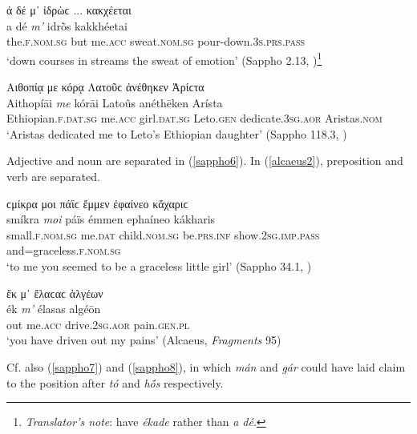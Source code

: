 \begin{exe}
\ex ἀ δέ μ᾽ ἰδρὼϲ ... κακχέεται\\
\gll a dé \emph{m'} idrṑs kakkhéetai\\
the.\textsc{f.nom.sg} but me.\textsc{acc} sweat.\textsc{nom.sg} pour-down.\textsc{3s.prs.pass}\\
\trans `down courses in streams the sweat of emotion' (Sappho 2.13, \citealp[31.13]{LobelPage1968})\footnote{\emph{Translator's note}: \citet[31.13]{LobelPage1968} have \textit{ékade} rather than \textit{a dé}.}
\label{sappho4}
\end{exe}

\begin{exe}
\ex Αιθοπίᾳ {με} κόρᾳ Λατοῦϲ ἀνέθηκεν Ἀρίϲτα\\
\gll Aithopíāi \emph{me} kórāi Latoûs anéthēken Arísta\\
Ethiopian.\textsc{f.dat.sg} me.\textsc{acc} girl.\textsc{dat.sg} Leto.\textsc{gen} dedicate.\textsc{3sg.aor} Aristas.\textsc{nom}\\
\trans `Aristas dedicated me to Leto's Ethiopian daughter' (Sappho 118.3, \citealp[Epigrammata 6.269]{LobelPage1968})
\label{sappho5}
\end{exe}

Adjective and noun are separated in (\ref{sappho6}). In (\ref{alcaeus2}), preposition and verb are separated.

\begin{exe}
\ex ϲμίκρα {μοι} πάϊϲ ἔμμεν ἐφαίνεο κἄχαριϲ\\
\gll smíkra \emph{moi} páïs émmen ephaíneo kákharis\\
small.\textsc{f.nom.sg} me.\textsc{dat} child.\textsc{nom.sg} be.\textsc{prs.inf} show.\textsc{2sg.imp.pass} and=graceless.\textsc{f.nom.sg}\\
\trans `to me you seemed to be a graceless little girl' (Sappho 34.1, \citealp[59.2]{LobelPage1968})
\label{sappho6}
\end{exe}

\begin{exe}
\ex ἔκ μ᾽ ἔλαϲαϲ ἀλγέων\\
\gll ék \emph{m'} élasas algéōn\\
out me.\textsc{acc} drive.\textsc{2sg.aor} pain.\textsc{gen.pl}\\
\trans `you have driven out my pains' (Alcaeus, \textit{Fragments} 95)
\label{alcaeus2}
\end{exe}

Cf. also (\ref{sappho7}) and (\ref{sappho8}), in which \textit{mán} and \textit{gár} could have laid claim to the position after \textit{tó} and \textit{hṓs} respectively.

